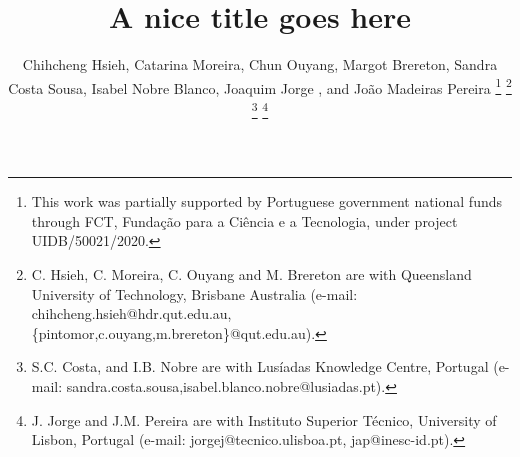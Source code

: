 \documentclass[journal,twoside,web, 11pt]{ieeecolor}
\begin{document}
\title{A nice title goes here}

\author{Chihcheng Hsieh, 
        Catarina Moreira,
        Chun Ouyang,
        Margot Brereton,
        Sandra Costa Sousa,
        Isabel Nobre Blanco, 
        Joaquim Jorge , and
        Jo\~{a}o Madeiras Pereira
\thanks{This work was partially supported by Portuguese government national funds through FCT, Funda\c{c}\~{a}o para a Ci\^{e}ncia e a Tecnologia, under project UIDB/50021/2020.}
\thanks{C. Hsieh, C. Moreira, C. Ouyang and M. Brereton are with Queensland University of Technology, Brisbane Australia (e-mail: chihcheng.hsieh@hdr.qut.edu.au, \{pintomor,c.ouyang,m.brereton\}@qut.edu.au). }
\thanks{S.C. Costa, and I.B. Nobre are with Lus\'{i}adas Knowledge Centre, Portugal (e-mail: {sandra.costa.sousa,isabel.blanco.nobre}@lusiadas.pt).}
\thanks{J. Jorge and J.M. Pereira are with Instituto Superior T\'{e}cnico, University of Lisbon, Portugal (e-mail: jorgej@tecnico.ulisboa.pt, jap@inesc-id.pt).}}

\maketitle



\begin{abstract}






\end{abstract}

\begin{IEEEkeywords}
\end{IEEEkeywords}
\end{document}
